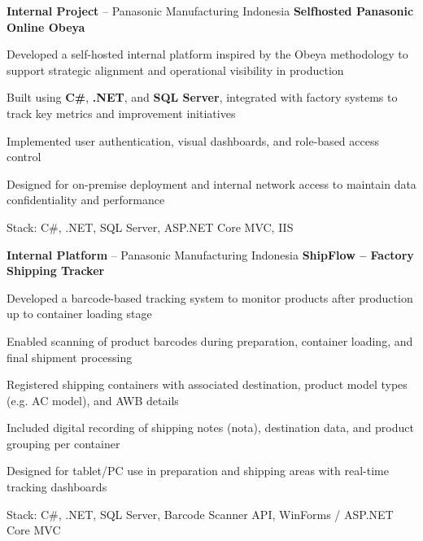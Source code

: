 \begin{twocolentrylink}{
		\textbf{Internal Project} -- Panasonic Manufacturing Indonesia
	}
	\textbf{Selfhosted Panasonic Online Obeya}
\end{twocolentrylink}
\begin{onecolentry}
	\begin{highlights}
		\item Developed a self-hosted internal platform inspired by the Obeya methodology to support strategic alignment and operational visibility in production
		\item Built using \textbf{C\#}, \textbf{.NET}, and \textbf{SQL Server}, integrated with factory systems to track key metrics and improvement initiatives
		\item Implemented user authentication, visual dashboards, and role-based access control
		\item Designed for on-premise deployment and internal network access to maintain data confidentiality and performance
		\item Stack: C\#, .NET, SQL Server, ASP.NET Core MVC, IIS
	\end{highlights}
\end{onecolentry}


\vspace{0.3 cm}


\begin{twocolentrylink}{
		\textbf{Internal Platform} -- Panasonic Manufacturing Indonesia
	}
	\textbf{ShipFlow -- Factory Shipping Tracker}
\end{twocolentrylink}
\begin{onecolentry}
	\begin{highlights}
		\item Developed a barcode-based tracking system to monitor products after production up to container loading stage
		\item Enabled scanning of product barcodes during preparation, container loading, and final shipment processing
		\item Registered shipping containers with associated destination, product model types (e.g. AC model), and AWB details
		\item Included digital recording of shipping notes (nota), destination data, and product grouping per container
		\item Designed for tablet/PC use in preparation and shipping areas with real-time tracking dashboards
		\item Stack: C\#, .NET, SQL Server, Barcode Scanner API, WinForms / ASP.NET Core MVC
	\end{highlights}
\end{onecolentry}


